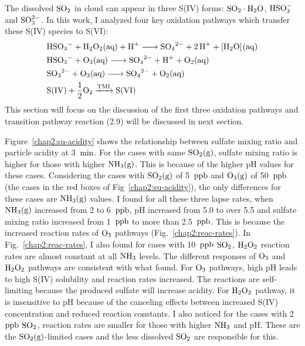 \documentclass[edeposit,fullpage]{uiucthesis2009}
\makeatletter
\DeclareRobustCommand*\unit[1]
 {\ensuremath{%
   {\thinmuskip3mu\relax
    \def\mu{\text{\textmu}}\def~{\,}%
    \ifx\f@series\testbx\mathbf{#1}\else\mathrm{#1}\fi}}}
\makeatother
\begin{document}
The dissolved $\rm SO_2$ in cloud can appear in three S(IV) forms: $\rm SO_2\cdot H_2O$, $\rm HSO_3^-$ and $\rm SO_3^{2-}$. In this work, 
I analyzed four key oxidation pathways which transfer these S(IV) species to S(VI):
\begin{align}
\centering
    &\ce{HSO3^- + H2O2{(aq)} + H^+ -> SO4^{2-} + 2H^+ + [H2O](aq)}\\
    &\ce{HSO3^- + O3{(aq)} -> SO4^{2-} + H^+ + O2{(aq)}} \\
    &\ce{SO3^{2-} + O3{(aq)} -> SO4^{2-} + O2{(aq)}} \\
    &\ce{S(IV) + \frac{1}{2}O2 ->[TMI] S(VI)}
\label{eq:chem-eq}
\end{align}
This section will focus on the discussion of the first three oxidation pathways and transition pathway reaction (2.9) will be discussed in next section.

Figure~\ref{chap2:su-acidity} shows the relationship between sulfate mixing ratio and particle acidity at 3~\unit{min}. For the cases with same $\rm SO_2(g)$, sulfate mixing ratio is higher for those with higher $\rm NH_3(g)$. This is because of the higher pH values for these cases. Considering the cases with $\rm SO_2(g)$ of 5~\unit{ppb} and $\rm O_3(g)$ of 50~\unit{ppb}(the cases in the red boxes of Fig~\ref{chap2:su-acidity}), the only differences for these cases are $\rm NH_3(g)$ values. I found for all these three lapse rates, when $\rm NH_3(g)$ increased from 2 to 6~\unit{ppb}, pH increased from 5.0 to over 5.5 and sulfate mixing ratio increased from 1~\unit{ppb} to more than 2.5~\unit{ppb}. This is because the increased reaction rates of $\rm O_3$ pathways (Fig.~\ref{chap2:reac-rates}). In Fig.~\ref{chap2:reac-rates}, I also found for cases with 10~\unit{ppb} $\rm SO_2$, $\rm H_2O_2$ reaction rates are almost constant at all $\rm NH_3$ levels. The different responses of $\rm O_3$ and $\rm H_2O_2$ pathways are consistent with what \citet{Seinfeld2016} found. For $\rm O_3$ pathways, high pH leads to high S(IV) solubility and reaction rates increased. The reactions are self-limiting because the produced sulfate will increase acidity. For $\rm H_2O_2$ pathway, it is insensitive to pH because of the canceling effects between increased S(IV) concentration and reduced reaction constants. I also noticed for the cases with 2~\unit{ppb} $\rm SO_2$, reaction rates are smaller for those with higher $\rm NH_3$ and pH. These are the $\rm SO_2(g)$-limited cases and the less dissolved $\rm SO_2$ are responsible for this.  
\end{document}
